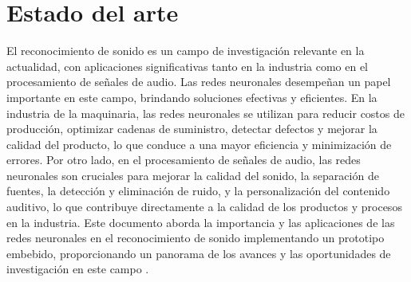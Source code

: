 \newpage
\setcounter{secnumdepth}{0}
\section{Estado del arte}

              
El reconocimiento de sonido es un campo de investigación relevante en la actualidad, con aplicaciones significativas tanto en la industria como en el procesamiento de señales de audio. Las redes neuronales desempeñan un papel importante en este campo, brindando soluciones efectivas y eficientes. En la industria de la maquinaria, las redes neuronales se utilizan para reducir costos de producción, optimizar cadenas de suministro, detectar defectos y mejorar la calidad del producto, lo que conduce a una mayor eficiencia y minimización de errores. Por otro lado, en el procesamiento de señales de audio, las redes neuronales son cruciales para mejorar la calidad del sonido, la separación de fuentes, la detección y eliminación de ruido, y la personalización del contenido auditivo, lo que contribuye directamente a la calidad de los productos y procesos en la industria. Este documento aborda la importancia y las aplicaciones de las redes neuronales en el reconocimiento de sonido implementando un prototipo embebido, proporcionando un panorama de los avances y las oportunidades de investigación en este campo \cite{agudoestudio, garciamendoza, gomezarmenta, leotronics, matich2018redes, atriaredes}.
